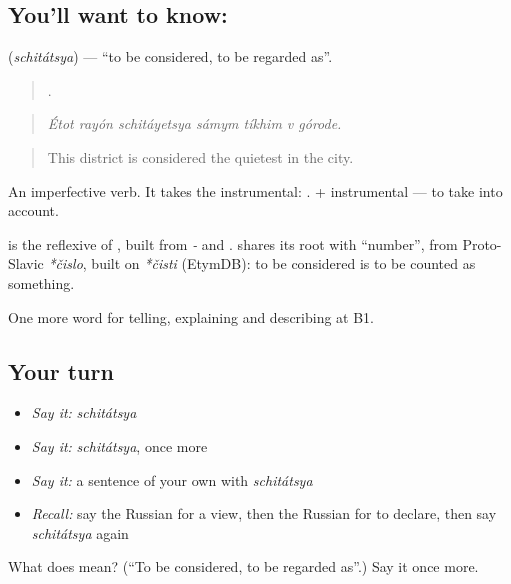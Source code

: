 \subsection*{You'll want to know: }
\textbf{} (\emph{schitátsya}) — \textquotedblleft{}to be considered, to be regarded as\textquotedblright{}.

\begin{quote}
      .
\end{quote}

\begin{quote}
\emph{Étot rayón schitáyetsya sámym tíkhim v górode.}
\end{quote}

\begin{quote}
This district is considered the quietest in the city.
\end{quote}

An imperfective verb. It takes the instrumental: \emph{ }. \emph{ } + instrumental — to take into account.

\begin{cousinweb}
\textbf{} is the reflexive of \emph{}, built from \emph{-} and \emph{}. \emph{} shares its root with \emph{} \textquotedblleft{}number\textquotedblright{}, from Proto-Slavic \emph{*čislo}, built on \emph{*čisti} (EtymDB): to be considered is to be counted as something.
\end{cousinweb}

\begin{grammarlens}[title={What you've built}]
One more word for telling, explaining and describing at B1.
\end{grammarlens}

\subsection*{Your turn}
\begin{itemize}
\raggedright
  \item \emph{Say it:} \emph{schitátsya}
  \item \emph{Say it:} \emph{schitátsya}, once more
  \item \emph{Say it:} a sentence of your own with \emph{schitátsya}
  \item \emph{Recall:} say the Russian for a view, then the Russian for to declare, then say \emph{schitátsya} again
\end{itemize}

\begin{tcolorbox}[breakable,colback=teal!4,colframe=teal!35!black,title={Before you move on}]
What does  mean? (\textquotedblleft{}To be considered, to be regarded as\textquotedblright{}.) Say it once more.
\end{tcolorbox}
